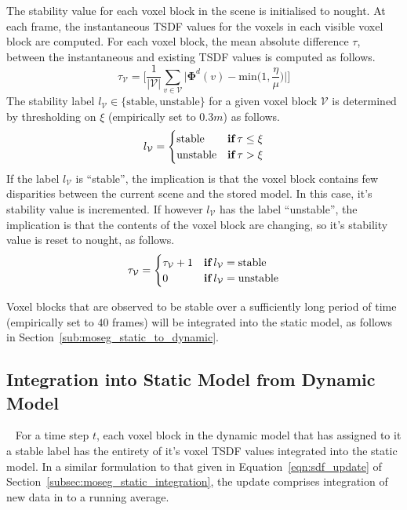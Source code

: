 The stability value for each voxel block in the scene is initialised to nought.
At each frame, the instantaneous TSDF values for the voxels in each visible
voxel block are computed. For each voxel block, the mean absolute difference
\( \tau \), between the instantaneous and existing TSDF values is computed as
follows.
\begin{equation}
  \label{eqn:moseg_stability_value}
  \tau_{\mathcal{V}} = \Bigg[ \frac{1}{|\mathcal{V}|} \sum_{v \in \mathcal{V}}
  \bigg|\bm{\Phi}^{d}(v) - \text{min}\bigg(1, \frac{\eta}{\mu}\bigg)\bigg| \Bigg]
\end{equation}
The stability label \( l_{\mathcal{V}} \in \{\text{stable}, \text{unstable}\} \) for
a given voxel block \(\mathcal{V}\) is determined by thresholding on \( \xi \) 
(empirically set to \(0.3m\)) as follows.
\begin{equation}
  \label{eqn:moseg_stability_labelling}
  l_{\mathcal{V}} =
  \begin{cases}
    \text{stable} & \textbf{if} \mkern4mu \tau \leq \xi \\
    \text{unstable} & \textbf{if} \mkern4mu \tau > \xi
  \end{cases}
\end{equation}
If the label \(l_{\mathcal{V}}\) is ``stable'', the implication is that the voxel
block contains few disparities between the current scene and the stored model.
In this case, it's stability value is incremented. If however
\(l_{\mathcal{V}}\) has the label ``unstable'', the implication is that the
contents of the voxel block are changing, so it's stability value is reset to
nought, as follows.
\begin{equation}
  \label{eqn:moseg_stability_update}
  \tau_{\mathcal{V}} =
  \begin{cases}
    \tau_{\mathcal{V}} + 1 & \textbf{if} \mkern4mu l_{\mathcal{V}} =
    \text{stable}\\
    0 & \textbf{if} \mkern4mu l_{\mathcal{V}} = \text{unstable}
  \end{cases}
\end{equation}

Voxel blocks that are observed to be stable over a sufficiently long period of
time (empirically set to \(40\) frames) will be integrated into the static model,
as follows in Section~\ref{sub:moseg_static_to_dynamic}.

\subsection{Integration into Static Model from Dynamic Model}
~\label{sub:moseg_static_to_dynamic}
For a time step \(t\), each voxel block in the dynamic model that has assigned to
it a stable label has the entirety of it's voxel TSDF values integrated into the
static model. In a similar formulation to that given in Equation~\ref{eqn:sdf_update}
of Section~\ref{subsec:moseg_static_integration}, the update comprises 
integration of new data in to a running average.

